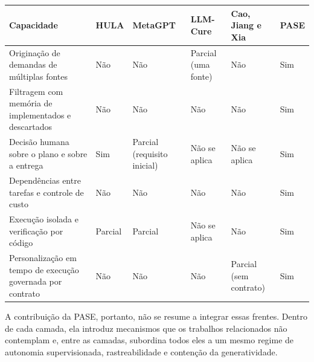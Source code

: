 \begin{quadro}[htb]
\centering
\caption{Comparação entre os trabalhos relacionados e a Arquitetura PASE}
\label{quadro:2}
\footnotesize
\renewcommand{\arraystretch}{1.25}
\begin{tabularx}{\textwidth}{|X|X|X|X|X|X|}
\hline
\textbf{Capacidade} & \textbf{HULA} & \textbf{MetaGPT} & \textbf{LLM-Cure} & \textbf{Cao, Jiang e Xia} & \textbf{PASE} \\
\hline
Originação de demandas de múltiplas fontes & Não & Não & Parcial (uma fonte) & Não & Sim \\
\hline
Filtragem com memória de implementados e descartados & Não & Não & Não & Não & Sim \\
\hline
Decisão humana sobre o plano e sobre a entrega & Sim & Parcial (requisito inicial) & Não se aplica & Não se aplica & Sim \\
\hline
Dependências entre tarefas e controle de custo & Não & Não & Não & Não & Sim \\
\hline
Execução isolada e verificação por código & Parcial & Parcial & Não se aplica & Não & Sim \\
\hline
Personalização em tempo de execução governada por contrato & Não & Não & Não & Parcial (sem contrato) & Sim \\
\hline
\end{tabularx}
\end{quadro}

A contribuição da PASE, portanto, não se resume a integrar essas frentes. Dentro de cada camada, ela introduz mecanismos que os trabalhos relacionados não contemplam e, entre as camadas, subordina todos eles a um mesmo regime de autonomia supervisionada, rastreabilidade e contenção da generatividade.
